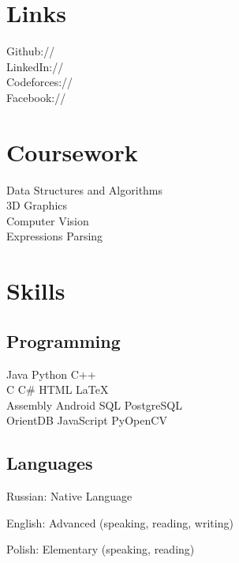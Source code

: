 \documentclass[]{deedy-resume-openfont}
\begin{document}
\begin{minipage}[t]{0.40\textwidth}

\section{Links}
\large
Github://\href{https://github.com/MaximCherchuk}{} \\
LinkedIn://\href{https://www.linkedin.com/in/maxim-cherchuk-6305aaa5/}{} \\
Codeforces://\href{http://codeforces.com/profile/MaxCherchuk}{} \\
Facebook://\href{https://www.facebook.com/profile.php?id=100004263036771}{}
\sectionsep

\section{Coursework}
\large
Data Structures and Algorithms \\
3D Graphics \\
Computer Vision \\
Expressions Parsing \\
\sectionsep


\end{minipage}
\begin{minipage}[t]{0.59\textwidth}

\section{Skills}
\subsection{Programming}
\large
Java \textbullet{} Python \textbullet{} C++\ \\
\large
C \textbullet{} C\# \textbullet{} HTML \textbullet{} \LaTeX \\

\large
Assembly \textbullet{} Android \textbullet{} SQL \textbullet{} PostgreSQL \\
\textbullet{} OrientDB \textbullet{} JavaScript \textbullet{} PyOpenCV
\sectionsep

\subsection{Languages}
\vspace{\topsep}
\begin{tightemize}
\item Russian: Native Language
\item English: Advanced (speaking, reading, writing)
\item Polish: Elementary (speaking, reading)
\end{tightemize}
\sectionsep
\end{minipage}
\end{document}
